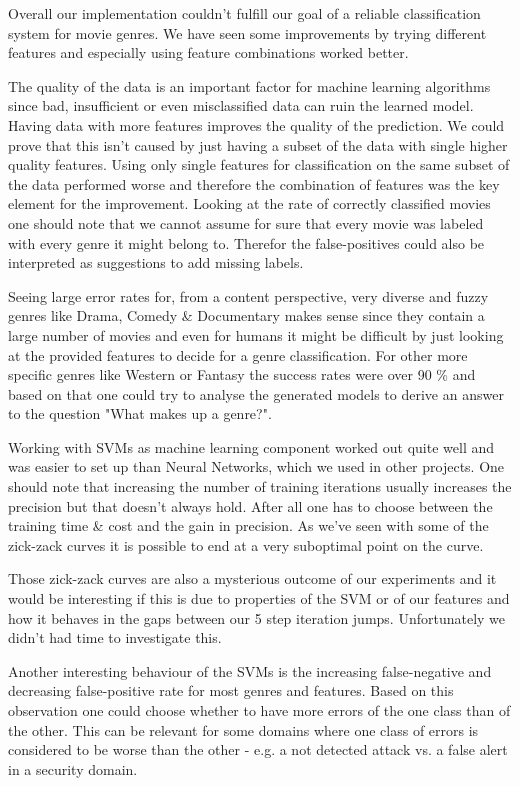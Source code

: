 \documentclass{vldb}
\begin{document}
\par Overall our implementation couldn't fulfill our goal of a reliable classification system for movie genres. We have seen some improvements by trying different features and especially using feature combinations worked better.
\par The quality of the data is an important factor for machine learning algorithms since bad, insufficient or even misclassified data can ruin the learned model. Having data with more features improves the quality of the prediction. We could prove that this isn't caused by just having a subset of the data with single higher quality features. Using only single features for classification on the same subset of the data performed worse and therefore the combination of features was the key element for the improvement. Looking at the rate of correctly classified movies one should note that we cannot assume for sure that every movie was labeled with every genre it might belong to. Therefor the false-positives could also be interpreted as suggestions to add missing labels.
\par Seeing large error rates for, from a content perspective, very diverse and fuzzy genres like Drama, Comedy \& Documentary makes sense since they contain a large number of movies and even for humans it might be difficult by just looking at the provided features to decide for a genre classification. For other more specific genres like Western or Fantasy the success rates were over 90 \% and based on that one could try to analyse the generated models to derive an answer to the question "What makes up a genre?".
\par Working with SVMs as machine learning component worked out quite well and was easier to set up than Neural Networks, which we used in other projects. One should note that increasing the number of training iterations usually increases the precision but that doesn't always hold. After all one has to choose between the training time \& cost and the gain in precision. As we've seen with some of the zick-zack curves it is possible to end at a very suboptimal point on the curve.
\par Those zick-zack curves are also a mysterious outcome of our experiments and it would be interesting if this is due to properties of the SVM or of our features and how it behaves in the gaps between our 5 step iteration jumps. Unfortunately we didn't had time to investigate this.
\par Another interesting behaviour of the SVMs is the increasing false-negative and decreasing false-positive rate for most genres and features. Based on this observation one could choose whether to have more errors of the one class than of the other. This can be relevant for some domains where one class of errors is considered to be worse than the other - e.g. a not detected attack vs. a false alert in a security domain.
\end{document}
